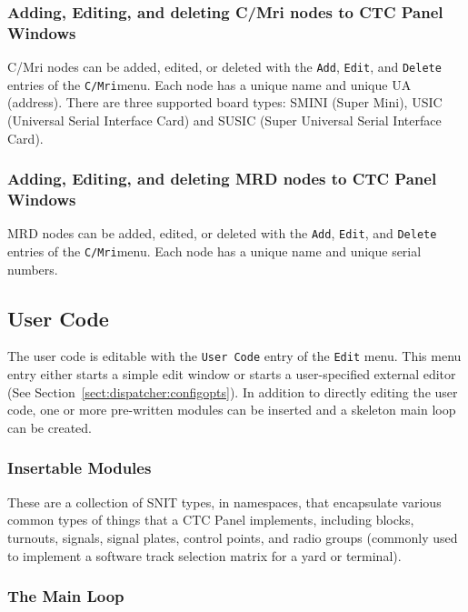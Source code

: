 \subsubsection{Adding, Editing, and deleting C/Mri nodes to CTC Panel
Windows}

C/Mri nodes can be added, edited, or deleted with the \verb=Add=,
\verb=Edit=, and \verb=Delete= entries of the \verb=C/Mri=menu. Each
node has a unique name and unique UA (address).  There are three
supported board types: SMINI (Super Mini), USIC (Universal Serial
Interface Card) and SUSIC (Super Universal Serial Interface Card).

\subsubsection{Adding, Editing, and deleting MRD nodes to CTC Panel
Windows}

MRD nodes can be added, edited, or deleted with the \verb=Add=,
\verb=Edit=, and \verb=Delete= entries of the \verb=C/Mri=menu. Each
node has a unique name and unique serial numbers.

\subsection{User Code}

The user code is editable with the \verb=User Code= entry of the
\verb=Edit= menu.  This menu entry either starts a simple edit window or
starts a user-specified external editor (See
Section~\ref{sect:dispatcher:configopts}).  In addition to directly
editing the user code, one or more pre-written modules can be inserted
and a skeleton main loop can be created.

\subsubsection{Insertable Modules}

These are a collection of SNIT types, in namespaces, that encapsulate
various common types of things that a CTC Panel implements, including
blocks, turnouts, signals, signal plates, control points, and radio
groups (commonly used to implement a software track selection matrix for
a yard or terminal).

\subsubsection{The Main Loop}

